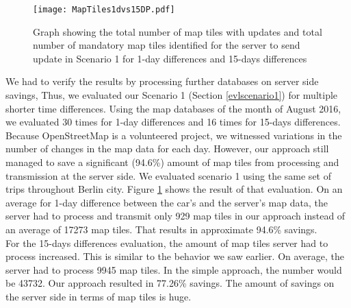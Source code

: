 \begin{figure}
\centering
\texttt{[image: MapTiles1dvs15DP.pdf]}
\caption{Graph showing the total number of map tiles with updates and total number of mandatory map tiles identified for the server to send update in Scenario 1 for 1-day differences and 15-days differences}
\label{fg:scenario11dv15d}
\end{figure}



We had to verify the results by processing further databases on server side savings, Thus, we evaluated our Scenario 1 (Section \ref{evlscenario1}) for multiple shorter time differences. Using the map databases of the month of August 2016, we evaluated 30 times for 1-day differences and 16 times for 15-days differences. Because OpenStreetMap is a volunteered project, we witnessed variations in the number of changes in the map data for each day. However, our approach still managed to save a significant (94.6\%) amount of map tiles from processing and transmission at the server side. We evaluated scenario 1 using the same set of trips throughout Berlin city. Figure \ref{fg:scenario11dv15d} shows the result of that evaluation. On an average for 1-day difference between the car's and the server's map data, the server had to process and transmit only 929 map tiles in our approach instead of an average of 17273 map tiles. That results in approximate 94.6\% savings. \\

For the 15-days differences evaluation, the amount of map tiles server had to process increased. This is similar to the behavior we saw earlier. On average, the server had to process 9945 map tiles. In the simple approach, the number would be 43732. Our approach resulted in 77.26\% savings. The amount of savings on the server side in terms of map tiles is huge. \\





